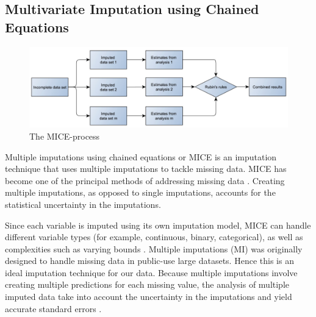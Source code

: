 
\subsection{Multivariate Imputation using Chained Equations}

\begin{figure}[htp]
\centering
\captionsetup{justification=centering}
  
  \centering
    \includegraphics[width=\textwidth]{Images/Mice.png}
  \caption{The MICE-process \cite{wulff2017multiple}}
\end{figure}


Multiple imputations using chained equations or MICE is an imputation technique that uses multiple imputations to tackle missing data. MICE has become one of the principal methods of addressing missing data \cite{azur2011multiple}. Creating multiple imputations, as opposed to single imputations, accounts for the statistical uncertainty in the imputations. 

Since each variable is imputed using its own imputation model, MICE can handle different
variable types (for example, continuous, binary, categorical), as well as complexities such as varying bounds \cite{wulff2017multiple}. Multiple imputations (MI) was originally designed to handle missing data in public-use large datasets. Hence this is an ideal imputation technique for our data. 
Because multiple imputations involve creating multiple predictions for each missing value, the analysis of multiple imputed data take into account the uncertainty in the imputations and yield accurate standard errors \cite{wulff2017multiple}. 

